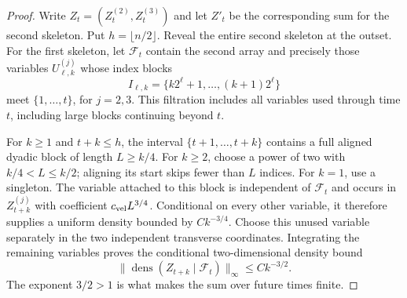 \begin{proof}
Write $Z_t=(Z_t^{(2)},Z_t^{(3)})$ and let $Z'_t$ be the corresponding
sum for the second skeleton.  Put $h=\lfloor n/2\rfloor$.  Reveal the
entire second skeleton at the outset.  For the first skeleton, let
$\mathcal F_t$ contain the second array and precisely those variables
$U^{(j)}_{\ell,k}$ whose index blocks
\[
 I_{\ell,k}=\{k2^\ell+1,\ldots,(k+1)2^\ell\}
\]
meet $\{1,\ldots,t\}$, for $j=2,3$.  This filtration includes all
variables used through time $t$, including large blocks continuing
beyond $t$.

For $k\ge1$ and $t+k\le h$, the interval
$\{t+1,\ldots,t+k\}$ contains a full aligned dyadic block of length
$L\ge k/4$.  For $k\ge2$, choose a power of two with
$k/4<L\le k/2$; aligning its start skips fewer than $L$ indices.
For $k=1$, use a singleton.  The variable attached to this block is
independent of $\mathcal F_t$ and occurs in $Z_{t+k}^{(j)}$ with
coefficient $c_{\rm vel}L^{3/4}$.  Conditional on every other variable,
it therefore supplies a uniform density bounded by $Ck^{-3/4}$.
Choose this unused variable separately in the two independent transverse
coordinates.  Integrating the remaining variables proves the conditional
two-dimensional density bound
\begin{equation}\label{lattice:conditional-density}
 \bigl\|\operatorname{dens}(Z_{t+k}\mid\mathcal F_t)\bigr\|_\infty
 \le Ck^{-3/2}.
\end{equation}
The exponent $3/2>1$ is what makes the sum over future times finite.


\end{proof}
